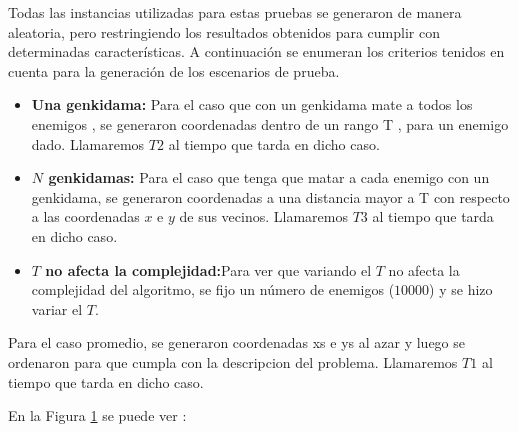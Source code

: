             Todas las instancias utilizadas para estas pruebas se generaron de manera aleatoria, pero restringiendo los resultados obtenidos para cumplir con determinadas características. A continuación se enumeran los criterios tenidos en cuenta para la generación de los escenarios de prueba.

            \begin{itemize}
                \item \textbf{Una genkidama:} Para el caso que con un genkidama mate a todos los enemigos , se generaron coordenadas dentro de un rango T , para un enemigo dado. Llamaremos $T2$ al tiempo que tarda en dicho caso.

                \item \textbf{$N$ genkidamas:} Para el caso que tenga que matar a cada enemigo con un genkidama, se generaron coordenadas a una distancia mayor a T con respecto a las coordenadas $x$ e $y$ de sus vecinos. Llamaremos $T3$ al tiempo que tarda en dicho caso.

                \item \textbf{$T$ no afecta la complejidad:}Para ver que variando el $T$ no afecta la complejidad del algoritmo, se fijo un número de enemigos ($10000$) y se hizo variar el $T$.


            \end{itemize}

   Para el caso promedio, se generaron coordenadas xs e ys al azar y luego se ordenaron para que cumpla con la descripcion del problema. Llamaremos $T1$ al tiempo que tarda en dicho caso.


    \renewcommand\constante{11.5}

	\begin{figure}[H]
		\centering
		\caption{}
		\label{fig:exp2:part_tiempo_base}
	\end{figure}
	En la Figura \ref{fig:exp2:part_tiempo_base} se puede ver :


